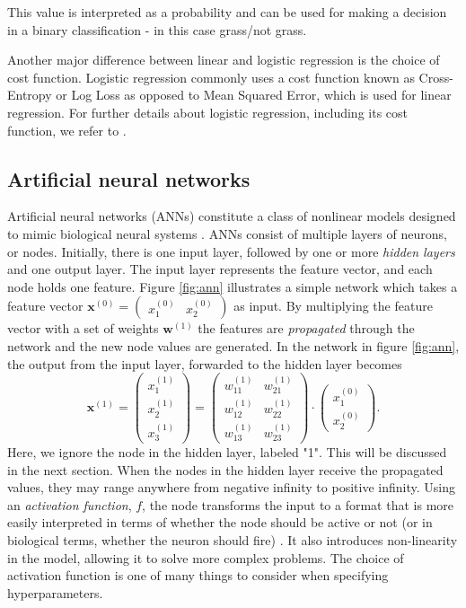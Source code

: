 This value is interpreted as a probability and can be used for making a decision in a binary classification - in this case grass/not grass.

Another major difference between linear and logistic regression is the choice of cost function. Logistic regression commonly uses a cost function known as Cross-Entropy or Log Loss as opposed to Mean Squared Error, which is used for linear regression. For further details about logistic regression, including its cost function, we refer to \citep{a_smola_svn_vishwanathan_2010}.

\subsection*{Artificial neural networks}
Artificial neural networks (ANNs) constitute a class of nonlinear models designed to mimic biological neural systems \citep{rojas_1996}. ANNs consist of multiple layers of neurons, or nodes. Initially, there is one input layer, followed by one or more \textit{hidden layers} and one output layer. \citep{logan_2017} The input layer represents the feature vector, and each node holds one feature. Figure \ref{fig:ann} illustrates a simple network which takes a feature vector $\mathbf{x}^{(0)}=\begin{pmatrix}x_1^{(0)} & x_2^{(0)}\end{pmatrix}$ as input. By multiplying the feature vector with a set of weights $\mathbf{w}^{(1)}$ the features are \textit{propagated} through the network and the new node values are generated. In the network in figure \ref{fig:ann}, the output from the input layer, forwarded to the hidden layer becomes
\begin{equation}
	\mathbf{x}^{(1)}=\begin{pmatrix}x_1^{(1)} \\ x_2^{(1)} \\ x_3^{(1)} \end{pmatrix} = 
	\begin{pmatrix} w_{11}^{(1)} & w_{21}^{(1)} \\ w_{12}^{(1)} & w_{22}^{(1)} \\ w_{13}^{(1)} & w_{23}^{(1)}\end{pmatrix}\cdot \begin{pmatrix}x_1^{(0)} \\ x_2^{(0)}\end{pmatrix}.
\end{equation}
Here, we ignore the node in the hidden layer, labeled "1". This will be discussed in the next section. When the nodes in the hidden layer receive the propagated values, they may range anywhere from negative infinity to positive infinity. Using an \textit{activation function}, $f$, the node transforms the input to a format that is more easily interpreted in terms of whether the node should be active or not (or in biological terms, whether the neuron should fire) \citep{kriesel_2007}. It also introduces non-linearity in the model, allowing it to solve more complex problems. The choice of activation function is one of many things to consider when specifying hyperparameters.

